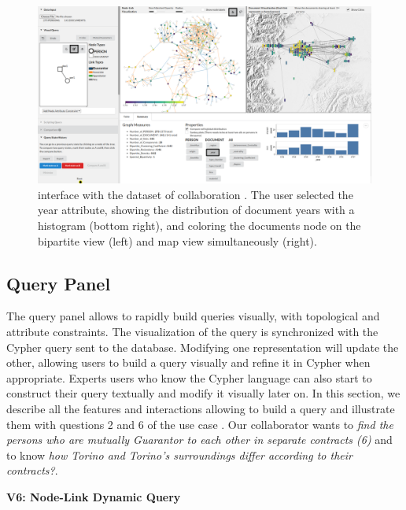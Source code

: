 \begin{figure}[!ht]
 \centering
    \includegraphics[trim={16cm 0 0 0},clip,width=\textwidth]{static/figures/ComBiNet/Piemont_timeSelected.png}
    \caption{\name interface with the dataset of collaboration \pascal. The user selected the year attribute, showing the distribution of document years with a histogram (bottom right), and coloring the documents node on the bipartite view (left) and map view simultaneously (right).}\label{fig:combinet-time-selected}
\end{figure}

\subsection{Query Panel}

The query panel allows to rapidly build queries visually, with topological and attribute constraints.
The visualization of the query is synchronized with the Cypher query sent to the database.
Modifying one representation will update the other, allowing users to build a query visually and refine it in Cypher when appropriate.
Experts users who know the Cypher language can also start to construct their query textually and modify it visually later on.
In this section, we describe all the features and interactions allowing \name to build a query and illustrate them with questions 2 and 6 of the use case \pascal.
Our collaborator wants to \textit{find the persons who are mutually Guarantor to each other in separate contracts (6)} and to know \textit{how Torino and Torino's surroundings differ according to their contracts?}.


\noindent\textbf{V6: Node-Link Dynamic Query}

